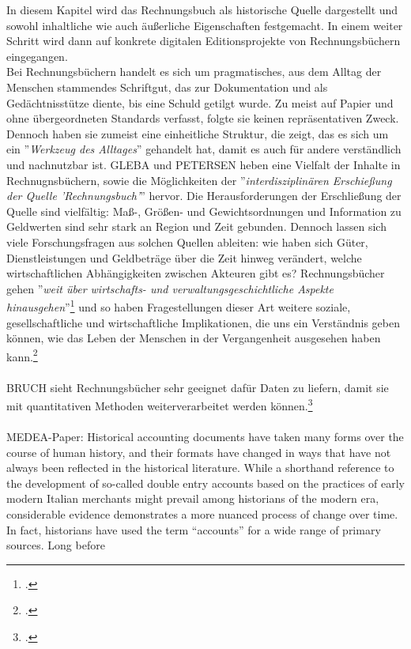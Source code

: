 \documentclass[12pt,a4paper]{article}
\begin{document}
In diesem Kapitel wird das Rechnungsbuch als historische Quelle dargestellt und sowohl inhaltliche wie auch äußerliche Eigenschaften festgemacht. In einem weiter Schritt wird dann auf konkrete digitalen Editionsprojekte von Rechnungsbüchern eingegangen.
\\
Bei Rechnungsbüchern handelt es sich um pragmatisches, aus dem Alltag der Menschen stammendes Schriftgut, das zur Dokumentation und als Gedächtnisstütze diente, bis eine Schuld getilgt wurde. Zu meist auf Papier und ohne übergeordneten Standards verfasst, folgte sie keinen repräsentativen Zweck. Dennoch haben sie zumeist eine einheitliche Struktur, die zeigt, das es sich um ein ''\textit{Werkzeug des Alltages}'' gehandelt hat, damit es auch für andere verständlich und nachnutzbar ist. GLEBA und PETERSEN heben eine Vielfalt der Inhalte in Rechnugnsbüchern, sowie die Möglichkeiten der ''\textit{interdisziplinären Erschießung der Quelle 'Rechnungsbuch'}'' hervor. Die Herausforderungen der Erschließung der Quelle sind vielfältig: Maß-, Größen- und Gewichtsordnungen und Information zu Geldwerten sind sehr stark an Region und Zeit gebunden. Dennoch lassen sich viele Forschungsfragen aus solchen Quellen ableiten: wie haben sich Güter, Dienstleistungen und Geldbeträge über die Zeit hinweg verändert, welche wirtschaftlichen Abhängigkeiten zwischen Akteuren gibt es? Rechnungsbücher gehen ''\textit{weit über wirtschafts- und verwaltungsgeschichtliche
Aspekte hinausgehen}''\footcite[Nach KLAPP,][S.14]{bauch2015daten} und so haben Fragestellungen dieser Art weitere soziale, gesellschaftliche und wirtschaftliche Implikationen, die uns ein Verständnis geben können, wie das Leben der Menschen in der Vergangenheit ausgesehen haben kann.\footcite[][S.7-10]{gleba2015einleitung}
\\
\\
BRUCH sieht Rechnungsbücher sehr geeignet dafür Daten zu liefern, damit sie mit quantitativen Methoden weiterverarbeitet werden können.\footcite{bauch2015daten}
\\
\\
MEDEA-Paper:
Historical accounting documents have taken many forms over the course of human history, and
their formats have changed in ways that have not always been reflected in the historical
literature. While a shorthand reference to the development of so-called double entry accounts
based on the practices of early modern Italian merchants might prevail among historians of the
modern era, considerable evidence demonstrates a more nuanced process of change over time. In
fact, historians have used the term “accounts” for a wide range of primary sources. Long before
\end{document}
